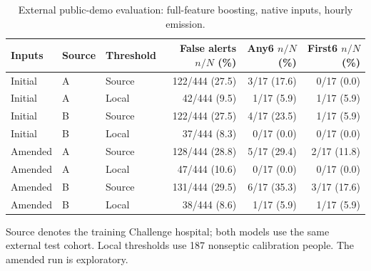 \begin{table}[tbp]
\centering
\footnotesize
\setlength{\tabcolsep}{4pt}
\renewcommand{\arraystretch}{1.18}
\caption{External public-demo evaluation: full-feature boosting, native inputs, hourly emission.}\label{tab:external}
\begin{tabular}{lllrrr}
\toprule
Inputs & Source & Threshold & \makecell{False alerts\\{}$n/N$ (\%)} & \makecell{Any6\\{}$n/N$ (\%)} & \makecell{First6\\{}$n/N$ (\%)} \\
\midrule
Initial & A & Source & 122/444 (27.5) & 3/17 (17.6) & 0/17 (0.0) \\
Initial & A & Local & 42/444 (9.5) & 1/17 (5.9) & 1/17 (5.9) \\
Initial & B & Source & 122/444 (27.5) & 4/17 (23.5) & 1/17 (5.9) \\
Initial & B & Local & 37/444 (8.3) & 0/17 (0.0) & 0/17 (0.0) \\
Amended & A & Source & 128/444 (28.8) & 5/17 (29.4) & 2/17 (11.8) \\
Amended & A & Local & 47/444 (10.6) & 0/17 (0.0) & 0/17 (0.0) \\
Amended & B & Source & 131/444 (29.5) & 6/17 (35.3) & 3/17 (17.6) \\
Amended & B & Local & 38/444 (8.6) & 1/17 (5.9) & 1/17 (5.9) \\
\bottomrule
\end{tabular}
\par\vspace{3pt}\begin{minipage}{\linewidth}\footnotesize Source denotes the training Challenge hospital; both models use the same external test cohort. Local thresholds use 187 nonseptic calibration people. The amended run is exploratory.\end{minipage}
\end{table}
